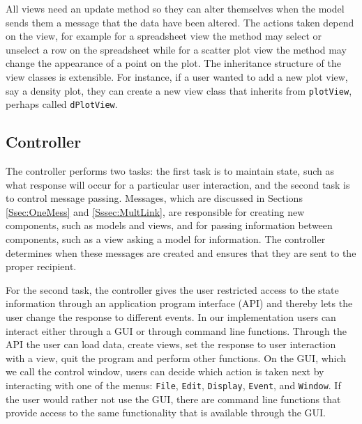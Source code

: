 \documentclass[11pt]{article}
\newcommand{\Rclass}[1]{\texttt{#1}}
\begin{document}
All views need an update method so they can alter themselves when the
model sends them a message that the data have been altered. The
actions taken depend on the view, for example for a spreadsheet view
the method may select or unselect a row on the spreadsheet while for
a scatter plot view the method may change the appearance of a point on
the plot.  The inheritance structure of the view classes is
extensible.  For instance, if a user wanted to add a new plot view,
say a density plot, they can create a new view class that inherits
from \Rclass{plotView}, perhaps called \Rclass{dPlotView}.

\subsection{Controller}
\label{Ssec:OneCont}

The controller performs two tasks: the first task is to maintain state,
such as what response will occur for a particular user interaction, 
and the second task is to control message passing.  Messages, which are
discussed in Sections \ref{Ssec:OneMess} and \ref{Sssec:MultLink}, are
responsible for creating new components, such as models and views, and for
passing information between components, such as a view asking a model for
information.  The controller determines when these messages are created and
ensures that they are sent to the proper recipient.

For the second task, the controller gives the user restricted access
to the state information through an application program interface
(API) and thereby lets the user change the response to different events. 
In our implementation users can interact either through a GUI
or through command line functions.  Through the API the user can load
data, create views, set the response to user interaction with a view,
quit the program and perform other functions.  On the GUI, which we call the
control window, users can decide which action is taken next by interacting
with one of the menus: \texttt{File}, \texttt{Edit},
\texttt{Display}, \texttt{Event}, and \texttt{Window}.  If the user
would rather not use the GUI, there are command line functions that
provide access to the same functionality that is available through the
GUI.  


\end{document}
